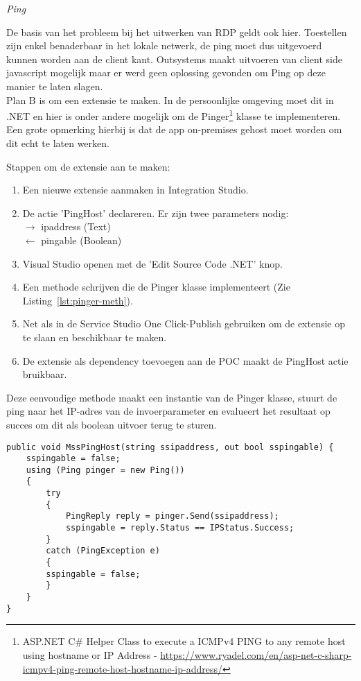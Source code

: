 \textit{Ping}

De basis van het probleem bij het uitwerken van RDP geldt ook hier. Toestellen zijn enkel benaderbaar in het lokale netwerk, de ping moet dus uitgevoerd kunnen worden aan de client kant. Outsystems maakt uitvoeren van client side javascript mogelijk maar er werd geen oplossing gevonden om Ping op deze manier te laten slagen.\\
Plan B is om een extensie te maken. In de persoonlijke omgeving moet dit in .NET en hier is onder andere mogelijk om de Pinger\footnote{ASP.NET C\# Helper Class to execute a ICMPv4 PING to any remote host using hostname or IP Address - \url{https://www.ryadel.com/en/asp-net-c-sharp-icmpv4-ping-remote-host-hostname-ip-address/}} klasse te implementeren. Een grote opmerking hierbij is dat de app on-premises gehost moet worden om dit echt te laten werken.

Stappen om de extensie aan te maken:
\begin{enumerate}
    \item Een nieuwe extensie aanmaken in Integration Studio.
    \item De actie 'PingHost' declareren. Er zijn twee parameters nodig:\\
    $\rightarrow$ ipaddress (Text)\\
    $\leftarrow$ pingable (Boolean)
    \item Visual Studio openen met de 'Edit Source Code .NET' knop.
    \item Een methode schrijven die de Pinger klasse implementeert (Zie Listing~\ref{lst:pinger-meth}). 
    \item Net als in de Service Studio One Click-Publish gebruiken om de extensie op te slaan en beschikbaar te maken.
    \item De extensie als dependency toevoegen aan de POC maakt de PingHost actie bruikbaar.
\end{enumerate}

Deze eenvoudige methode maakt een instantie van de Pinger klasse, stuurt de ping naar het IP-adres van de invoerparameter en evalueert het resultaat op succes om dit als boolean uitvoer terug te sturen. 
\begin{lstlisting}[style=CSharpStyle,label={lst:pinger-meth},caption={Pinger implementatie},captionpos=b]
public void MssPingHost(string ssipaddress, out bool sspingable) {
    sspingable = false;
    using (Ping pinger = new Ping())
    {
        try
        {
            PingReply reply = pinger.Send(ssipaddress);
            sspingable = reply.Status == IPStatus.Success;
        }
        catch (PingException e)
        {
        sspingable = false;
        }
    }
}
\end{lstlisting}

